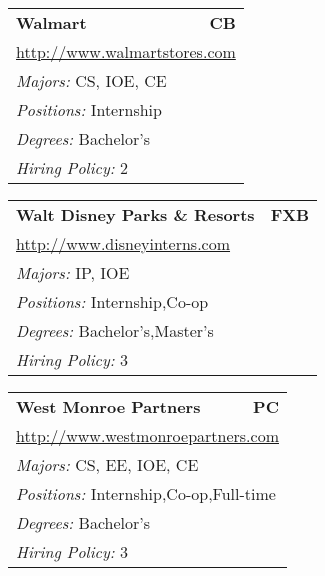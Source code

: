 \documentclass[twoside]{article}
\begin{document}
\begin{center}
\begin{multicols}{3}
\begin{FlushLeft}
\begin{minipage}{.9\columnwidth}
\end{minipage}
 
\begin{minipage}{.9\columnwidth}\begin{tabularx}{.95\columnwidth}{Xr}
                 {\Large\bf Walmart} & {\Large\bf CB}\\
    \multicolumn{2}{p{.95\columnwidth}}{\url{http://www.walmartstores.com}}\\
    \multicolumn{2}{p{.95\columnwidth}}{\emph{Majors:} CS, IOE, CE}\\
    \multicolumn{2}{p{.95\columnwidth}}{\emph{Positions:} Internship}\\
    \multicolumn{2}{p{.95\columnwidth}}{\emph{Degrees:} Bachelor's}\\
    \multicolumn{2}{p{.95\columnwidth}}{\emph{Hiring Policy:} 2}\\
    \end{tabularx}
    
\end{minipage}
 
\begin{minipage}{.9\columnwidth}\begin{tabularx}{.95\columnwidth}{Xr}
                 {\Large\bf Walt Disney Parks \& Resorts} & {\Large\bf FXB}\\
    \multicolumn{2}{p{.95\columnwidth}}{\url{http://www.disneyinterns.com}}\\
    \multicolumn{2}{p{.95\columnwidth}}{\emph{Majors:} IP, IOE}\\
    \multicolumn{2}{p{.95\columnwidth}}{\emph{Positions:} Internship,Co-op}\\
    \multicolumn{2}{p{.95\columnwidth}}{\emph{Degrees:} Bachelor's,Master's}\\
    \multicolumn{2}{p{.95\columnwidth}}{\emph{Hiring Policy:} 3}\\
    \end{tabularx}
    
\end{minipage}
 
\begin{minipage}{.9\columnwidth}\begin{tabularx}{.95\columnwidth}{Xr}
                 {\Large\bf West Monroe Partners} & {\Large\bf PC}\\
    \multicolumn{2}{p{.95\columnwidth}}{\url{http://www.westmonroepartners.com}}\\
    \multicolumn{2}{p{.95\columnwidth}}{\emph{Majors:} CS, EE, IOE, CE}\\
    \multicolumn{2}{p{.95\columnwidth}}{\emph{Positions:} Internship,Co-op,Full-time}\\
    \multicolumn{2}{p{.95\columnwidth}}{\emph{Degrees:} Bachelor's}\\
    \multicolumn{2}{p{.95\columnwidth}}{\emph{Hiring Policy:} 3}\\
    \end{tabularx}
    

\end{minipage}
\end{FlushLeft}
\end{multicols}
\end{center}
\end{document}

